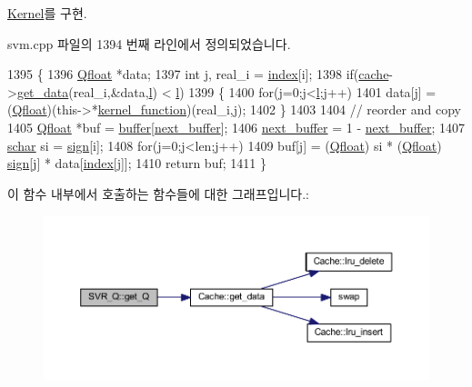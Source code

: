 \hyperlink{class_kernel_a30483355cbb8b5ab4e4c7a93bcef7429}{Kernel}를 구현.



svm.\+cpp 파일의 1394 번째 라인에서 정의되었습니다.


\begin{DoxyCode}
1395     \{
1396         \hyperlink{svm_8cpp_a8755d90a54ecfb8d15051af3e0542592}{Qfloat} *data;
1397         \textcolor{keywordtype}{int} j, real\_i = \hyperlink{class_s_v_r___q_a29e769c577358f518182ba3cbe255817}{index}[i];
1398         \textcolor{keywordflow}{if}(\hyperlink{class_s_v_r___q_acb75212bdcc8128a28b35601f8265828}{cache}->\hyperlink{class_cache_aca49263fb34641e208884cc223b25317}{get\_data}(real\_i,&data,\hyperlink{class_s_v_r___q_aa3420dab3d0b1eabdc0614c71321ab3c}{l}) < \hyperlink{class_s_v_r___q_aa3420dab3d0b1eabdc0614c71321ab3c}{l})
1399         \{
1400             \textcolor{keywordflow}{for}(j=0;j<\hyperlink{class_s_v_r___q_aa3420dab3d0b1eabdc0614c71321ab3c}{l};j++)
1401                 data[j] = (\hyperlink{svm_8cpp_a8755d90a54ecfb8d15051af3e0542592}{Qfloat})(this->*\hyperlink{class_kernel_a575eeb588e8a5c62ff3228a35e255a02}{kernel\_function})(real\_i,j);
1402         \}
1403 
1404         \textcolor{comment}{// reorder and copy}
1405         \hyperlink{svm_8cpp_a8755d90a54ecfb8d15051af3e0542592}{Qfloat} *buf = \hyperlink{class_s_v_r___q_a294d15ab4ee01b92c960a604afbd6f9f}{buffer}[\hyperlink{class_s_v_r___q_acbdbde823b714d30097648c9dc109524}{next\_buffer}];
1406         \hyperlink{class_s_v_r___q_acbdbde823b714d30097648c9dc109524}{next\_buffer} = 1 - \hyperlink{class_s_v_r___q_acbdbde823b714d30097648c9dc109524}{next\_buffer};
1407         \hyperlink{svm_8cpp_a0fd9ce9d735064461bebfe6037026093}{schar} si = \hyperlink{class_s_v_r___q_a0255ad0a00ef589c69adc19a06527dfc}{sign}[i];
1408         \textcolor{keywordflow}{for}(j=0;j<len;j++)
1409             buf[j] = (\hyperlink{svm_8cpp_a8755d90a54ecfb8d15051af3e0542592}{Qfloat}) si * (\hyperlink{svm_8cpp_a8755d90a54ecfb8d15051af3e0542592}{Qfloat}) \hyperlink{class_s_v_r___q_a0255ad0a00ef589c69adc19a06527dfc}{sign}[j] * data[\hyperlink{class_s_v_r___q_a29e769c577358f518182ba3cbe255817}{index}[j]];
1410         \textcolor{keywordflow}{return} buf;
1411     \}
\end{DoxyCode}


이 함수 내부에서 호출하는 함수들에 대한 그래프입니다.\+:
\nopagebreak
\begin{figure}[H]
\begin{center}
\leavevmode
\includegraphics[width=350pt]{class_s_v_r___q_aba55078d17e7815f093ffa154f3cee9d_cgraph}
\end{center}
\end{figure}


